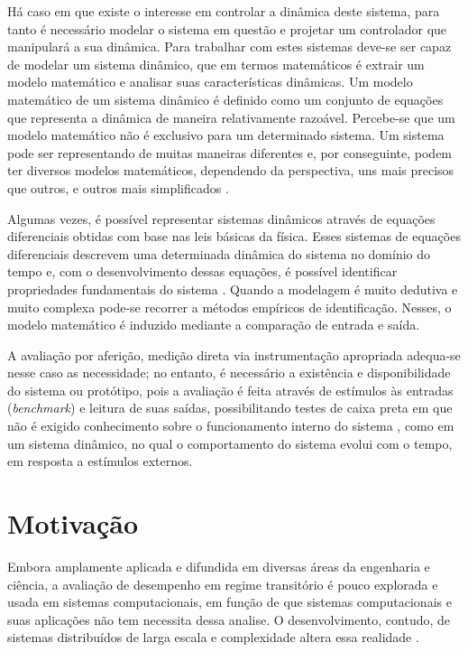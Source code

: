 Há caso em que existe o interesse em controlar a dinâmica deste sistema, para tanto é necessário modelar o sistema em questão e projetar um controlador que manipulará a sua dinâmica. Para trabalhar com estes sistemas deve-se ser capaz de modelar um sistema dinâmico, que em termos matemáticos é extrair um modelo matemático e analisar suas características dinâmicas. Um modelo matemático de um sistema dinâmico é definido como um conjunto de equações que representa a dinâmica de maneira relativamente razoável. Percebe-se que um modelo matemático não é exclusivo para um determinado sistema. Um sistema pode ser representando de muitas maneiras diferentes e, por conseguinte, podem ter diversos modelos matemáticos, dependendo da perspectiva, uns mais precisos que outros, e outros mais simplificados \cite{Ogata2001}.

Algumas vezes, é possível representar sistemas dinâmicos através de equações diferenciais obtidas com base nas leis básicas da física. Esses sistemas de equações diferenciais descrevem uma determinada dinâmica do sistema no domínio do tempo e, com o desenvolvimento dessas equações, é possível identificar propriedades fundamentais do sistema \cite{Nobile2013}. Quando a modelagem é muito dedutiva e muito complexa pode-se recorrer a métodos empíricos de identificação. Nesses, o modelo matemático é induzido mediante a comparação de entrada e saída.	


A avaliação por aferição, medição direta via instrumentação apropriada adequa-se nesse caso as necessidade; no entanto, é necessário a existência e disponibilidade do sistema ou protótipo, pois a avaliação é feita através de estímulos às entradas (\textit{benchmark}) e leitura de suas saídas, possibilitando testes de caixa preta em que não é exigido conhecimento sobre o funcionamento interno do sistema \cite{Nobile2013}, como em um sistema dinâmico, no qual o comportamento do sistema evolui com o tempo, em resposta a estímulos externos.

\section{Motivação}

Embora amplamente aplicada e difundida em diversas áreas da engenharia e ciência, a avaliação de desempenho em regime transitório é pouco explorada e usada em sistemas computacionais, em função de que sistemas computacionais e suas aplicações não tem necessita dessa analise. O desenvolvimento, contudo, de sistemas distribuídos de larga escala e complexidade altera essa realidade \cite{hpcs2015, Lourenco2015, medc}.

